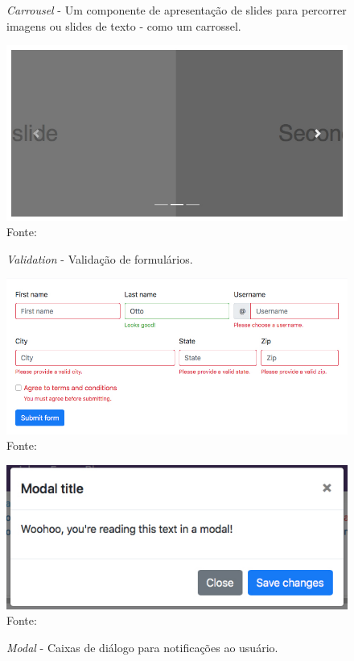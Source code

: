 \documentclass[
	12pt,				%
	openright,			%
	twoside,			%
	a4paper,			%
	english,			%
	brazil				%
	]{abntex2}
\begin{document}
\begin{figure}[h]
	\centering

	\caption{\textit{Carrousel} - Um componente de apresentação de slides para percorrer imagens ou slides de texto - como um carrossel.} \label{fig:JSExampleCarrousel}
    \includegraphics[scale=0.35]{js-example-carousel} \\
    Fonte: {\citeauthor{bootstrap_docs}}

    \caption{\textit{Validation} - Validação de formulários.} \label{fig:JSExampleValidation}
    \includegraphics[scale=0.4]{js-example-validation} \\
    Fonte: {\citeauthor{bootstrap_docs}}
	
    \caption{\textit{Modal} - Caixas de diálogo para notificações ao usuário.} \label{fig:JSExampleModal}
    \includegraphics[scale=0.45]{js-example-modal} \\
    Fonte: {\citeauthor{bootstrap_docs}}

\end{figure}
\end{document}
